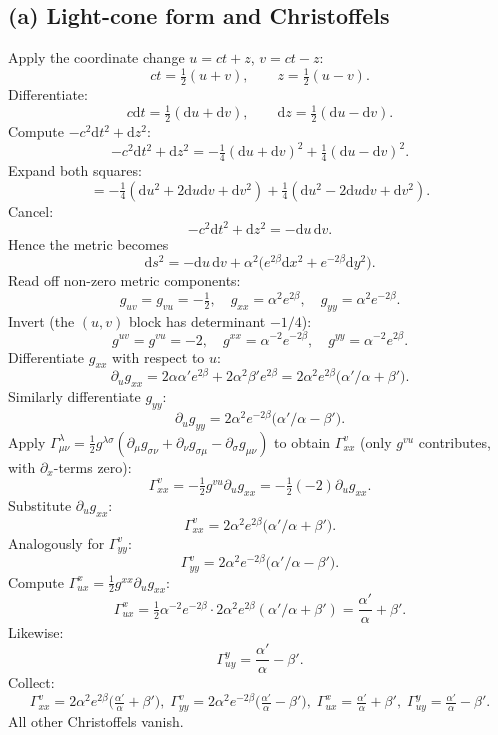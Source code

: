 \documentclass[11pt]{article}
\newcommand{\de}{\mathrm{d}}
\begin{document}
\subsection*{(a) Light-cone form and Christoffels}

Apply the coordinate change $u=ct+z$, $v=ct-z$:
\[
ct=\tfrac{1}{2}(u+v),\qquad z=\tfrac{1}{2}(u-v).
\]
Differentiate:
\[
c\de t=\tfrac{1}{2}(\de u+\de v),\qquad \de z=\tfrac{1}{2}(\de u-\de v).
\]
Compute $-c^{2}\de t^{2}+\de z^{2}$:
\[
-c^{2}\de t^{2}+\de z^{2}=-\tfrac{1}{4}(\de u+\de v)^{2}+\tfrac{1}{4}(\de u-\de v)^{2}.
\]
Expand both squares:
\[
=-\tfrac{1}{4}(\de u^{2}+2\de u\de v+\de v^{2})+\tfrac{1}{4}(\de u^{2}-2\de u\de v+\de v^{2}).
\]
Cancel:
\[
-c^{2}\de t^{2}+\de z^{2}=-\de u\,\de v.
\]
Hence the metric becomes
\begin{equation}
\boxed{\;\de s^{2}=-\de u\,\de v+\alpha^{2}\bigl(e^{2\beta}\de x^{2}+e^{-2\beta}\de y^{2}\bigr).\;}
\label{eq:ppmetric}
\end{equation}
Read off non-zero metric components:
\[
g_{uv}=g_{vu}=-\tfrac{1}{2},\quad g_{xx}=\alpha^{2}e^{2\beta},\quad g_{yy}=\alpha^{2}e^{-2\beta}.
\]
Invert (the $(u,v)$ block has determinant $-1/4$):
\[
g^{uv}=g^{vu}=-2,\quad g^{xx}=\alpha^{-2}e^{-2\beta},\quad g^{yy}=\alpha^{-2}e^{2\beta}.
\]
Differentiate $g_{xx}$ with respect to $u$:
\[
\partial_{u}g_{xx}=2\alpha\alpha'e^{2\beta}+2\alpha^{2}\beta'e^{2\beta}=2\alpha^{2}e^{2\beta}\bigl(\alpha'/\alpha+\beta'\bigr).
\]
Similarly differentiate $g_{yy}$:
\[
\partial_{u}g_{yy}=2\alpha^{2}e^{-2\beta}\bigl(\alpha'/\alpha-\beta'\bigr).
\]
Apply $\Gamma^{\lambda}_{\mu\nu}=\tfrac{1}{2}g^{\lambda\sigma}(\partial_{\mu}g_{\sigma\nu}+\partial_{\nu}g_{\sigma\mu}-\partial_{\sigma}g_{\mu\nu})$ to obtain $\Gamma^{v}_{xx}$ (only $g^{vu}$ contributes, with $\partial_x$-terms zero):
\[
\Gamma^{v}_{xx}=-\tfrac{1}{2}g^{vu}\partial_{u}g_{xx}=-\tfrac{1}{2}(-2)\partial_{u}g_{xx}.
\]
Substitute $\partial_{u}g_{xx}$:
\[
\Gamma^{v}_{xx}=2\alpha^{2}e^{2\beta}\bigl(\alpha'/\alpha+\beta'\bigr).
\]
Analogously for $\Gamma^{v}_{yy}$:
\[
\Gamma^{v}_{yy}=2\alpha^{2}e^{-2\beta}\bigl(\alpha'/\alpha-\beta'\bigr).
\]
Compute $\Gamma^{x}_{ux}=\tfrac{1}{2}g^{xx}\partial_{u}g_{xx}$:
\[
\Gamma^{x}_{ux}=\tfrac{1}{2}\alpha^{-2}e^{-2\beta}\cdot 2\alpha^{2}e^{2\beta}(\alpha'/\alpha+\beta')=\frac{\alpha'}{\alpha}+\beta'.
\]
Likewise:
\[
\Gamma^{y}_{uy}=\frac{\alpha'}{\alpha}-\beta'.
\]
Collect:
\[
\boxed{\;\Gamma^{v}_{xx}=2\alpha^{2}e^{2\beta}\!\bigl(\tfrac{\alpha'}{\alpha}+\beta'\bigr),\;\Gamma^{v}_{yy}=2\alpha^{2}e^{-2\beta}\!\bigl(\tfrac{\alpha'}{\alpha}-\beta'\bigr),\;\Gamma^{x}_{ux}=\tfrac{\alpha'}{\alpha}+\beta',\;\Gamma^{y}_{uy}=\tfrac{\alpha'}{\alpha}-\beta'.\;}
\]
All other Christoffels vanish.
\end{document}

